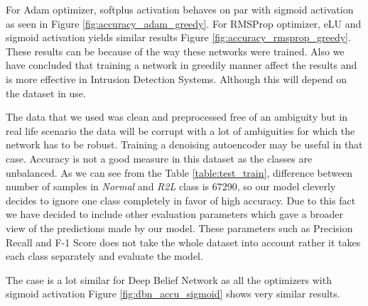 \documentclass[12pt, a4paper]{report}
\begin{document}
For Adam optimizer, softplus activation behaves on par with sigmoid activation as seen in Figure \ref{fig:accuracy_adam_greedy}. For RMSProp optimizer, eLU and sigmoid activation yields similar results Figure \ref{fig:accuracy_rmsprop_greedy}. These results can be because of the way these networks were trained. Also we have concluded that training a network in greedily manner affect the results and is more effective in Intrusion Detection Systems. Although this will depend on the dataset in use.\\ \par

The data that we used was clean and preprocessed free of an ambiguity but in real life scenario the data will be corrupt with a lot of ambiguities for which the network has to be robust. Training a denoising autoencoder may be useful in that case. Accuracy is not a good measure in this dataset as the classes are unbalanced. As we can see from the Table \ref{table:test_train},  difference between number of samples in \textit{Normal} and \textit{R2L} class is 67290, so our model cleverly decides to ignore one class completely in favor of high accuracy. Due to this fact we have decided to include other evaluation parameters which gave a broader view of the predictions made by our model. These parameters such as Precision Recall and F-1 Score does not take the whole dataset into account rather it takes each class separately and evaluate the model.   
\\ \par
The case is a lot similar for Deep Belief Network as all the optimizers with sigmoid activation Figure \ref{fig:dbn_accu_sigmoid} shows very similar results.
\end{document}
